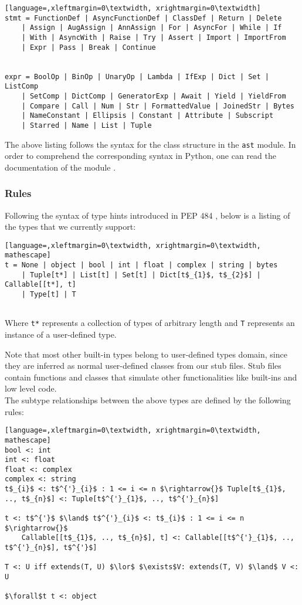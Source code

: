 \begin{lstlisting}[language=,xleftmargin=0\textwidth, xrightmargin=0\textwidth]
stmt = FunctionDef | AsyncFunctionDef | ClassDef | Return | Delete
	| Assign | AugAssign | AnnAssign | For | AsyncFor | While | If
	| With | AsyncWith | Raise | Try | Assert | Import | ImportFrom
	| Expr | Pass | Break | Continue


expr = BoolOp | BinOp | UnaryOp | Lambda | IfExp | Dict | Set | ListComp
	| SetComp | DictComp | GeneratorExp | Await | Yield | YieldFrom
	| Compare | Call | Num | Str | FormattedValue | JoinedStr | Bytes
	| NameConstant | Ellipsis | Constant | Attribute | Subscript
	| Starred | Name | List | Tuple

\end{lstlisting}
The above listing follows the syntax for the class structure in the \lstinline|ast| module. In order to comprehend the corresponding syntax in Python, one can read the documentation of the module \cite{ast_documentation}.


\subsubsection{Rules}
Following the syntax of type hints introduced in PEP 484 \cite{484}, below is a listing of the types that we currently support:

\begin{lstlisting}[language=,xleftmargin=0\textwidth, xrightmargin=0\textwidth, mathescape]
t = None | object | bool | int | float | complex | string | bytes
	| Tuple[t*] | List[t] | Set[t] | Dict[t$_{1}$, t$_{2}$] | Callable[[t*], t]
	| Type[t] | T
	
\end{lstlisting}

Where \lstinline|t*| represents a collection of types of arbitrary length and \lstinline|T| represents an instance of a user-defined type.

Note that most other built-in types belong to user-defined types domain, since they are inferred as normal user-defined classes from our stub files. Stub files contain functions and classes that simulate other functionalities like built-ins and low level code. \\

The subtype relationships between the above types are defined by the following rules:

\begin{lstlisting}[language=,xleftmargin=0\textwidth, xrightmargin=0\textwidth, mathescape]
bool <: int
int <: float
float <: complex
complex <: string
t$_{i}$ <: t$^{'}_{i}$ : 1 <= i <= n $\rightarrow{}$ Tuple[t$_{1}$, .., t$_{n}$] <: Tuple[t$^{'}_{1}$, .., t$^{'}_{n}$]

t <: t$^{'}$ $\land$ t$^{'}_{i}$ <: t$_{i}$ : 1 <= i <= n $\rightarrow{}$
	Callable[[t$_{1}$, .., t$_{n}$], t] <: Callable[[t$^{'}_{1}$, .., t$^{'}_{n}$], t$^{'}$]
	
T <: U iff extends(T, U) $\lor$ $\exists$V: extends(T, V) $\land$ V <: U 
	
$\forall$t t <: object
\end{lstlisting}


